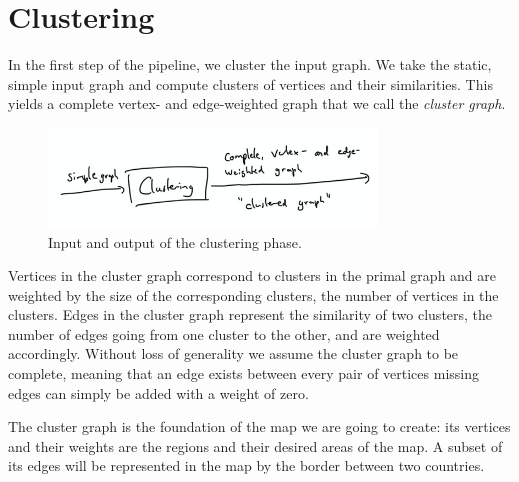 \section{Clustering}
\label{sect:clustering}

In the first step of the pipeline, we cluster the input graph. We take the static, simple input graph and compute clusters of vertices and their similarities. This yields a complete vertex- and edge-weighted graph that we call the \emph{cluster graph}.

\begin{figure}[H]
	\centering\includegraphics[height=100px]{Resources/Pipeline-Clustering.png}
	\caption{Input and output of the clustering phase.}
	\label{fig:pipeline-clustering}
\end{figure}

Vertices in the cluster graph correspond to clusters in the primal graph and are weighted by the size of the corresponding clusters, \ie{} the number of vertices in the clusters. Edges in the cluster graph represent the similarity of two clusters, \ie{} the number of edges going from one cluster to the other, and are weighted accordingly. Without loss of generality we assume the cluster graph to be complete, meaning that an edge exists between every pair of vertices \emdash{} missing edges can simply be added with a weight of zero.

The cluster graph is the foundation of the map we are going to create: its vertices and their weights are the regions and their desired areas of the map. A subset of its edges will be represented in the map by the border between two countries.
